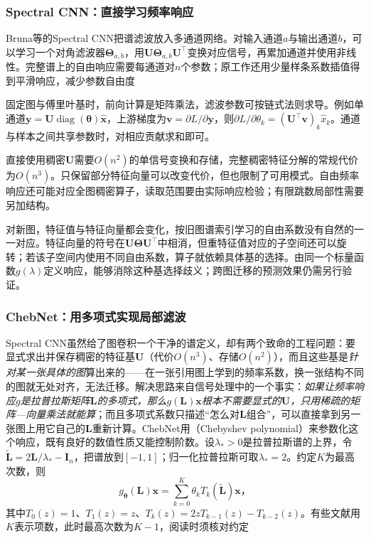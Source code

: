 \subsubsection{Spectral CNN：直接学习频率响应}
\label{sec:gnn-spectral-cnn}

Bruna等的Spectral CNN把谱滤波放入多通道网络。对输入通道$a$与输出通道$b$，可以学习一个对角滤波器$\bm{\Theta}_{a,b}$，用$\bm{U}\bm{\Theta}_{a,b}\bm{U}^{\top}$变换对应信号，再累加通道并使用非线性。完整谱上的自由响应需要每通道对$n$个参数；原工作还用少量样条系数插值得到平滑响应，减少参数自由度

固定图与傅里叶基时，前向计算是矩阵乘法，滤波参数可按链式法则求导。例如单通道$\bm{y}=\bm{U}\operatorname{diag}(\bm{\theta})\widehat{\bm{x}}$，上游梯度为$\bm{v}=\partial L/\partial\bm{y}$，则$\partial L/\partial\theta_k=(\bm{U}^{\top}\bm{v})_k\widehat x_k$。通道与样本之间共享参数时，对相应贡献求和即可。

直接使用稠密$\bm{U}$需要$O(n^2)$的单信号变换和存储，完整稠密特征分解的常规代价为$O(n^3)$。只保留部分特征向量可以改变代价，但也限制了可用模式。自由频率响应还可能对应全图稠密算子，读取范围要由实际响应检验；有限跳数局部性需要另加结构。

对新图，特征值与特征向量都会变化，按旧图谱索引学习的自由系数没有自然的一一对应。特征向量的符号在$\bm{U}\bm{\Theta}\bm{U}^{\top}$中相消，但重特征值对应的子空间还可以旋转；若该子空间内使用不同自由系数，算子就依赖具体基的选择。由同一个标量函数$g(\lambda)$定义响应，能够消除这种基选择歧义；跨图迁移的预测效果仍需另行验证。

\subsubsection{ChebNet：用多项式实现局部滤波}
\label{sec:gnn-chebnet}

Spectral CNN虽然给了图卷积一个干净的谱定义，却有两个致命的工程问题：要显式求出并保存稠密的特征基$\bm U$（代价$O(n^3)$、存储$O(n^2)$），而且这些基是\emph{针对某一张具体的图}算出来的——在一张引用图上学到的频率系数，换一张结构不同的图就无处对齐，无法迁移。解决思路来自信号处理中的一个事实：\emph{如果让频率响应$g$是拉普拉斯矩阵$\bm L$的多项式，那么$g(\bm L)\bm x$根本不需要显式的$\bm U$，只用稀疏的矩阵—向量乘法就能算}；而且多项式系数只描述“怎么对$\bm L$组合”，可以直接拿到另一张图上用它自己的$\bm L$重新计算。ChebNet用（Chebyshev polynomial）来参数化这个响应，既有良好的数值性质又能控制阶数。设$\lambda_*>0$是拉普拉斯谱的上界，令$\widetilde{\bm{L}}=2\bm{L}/\lambda_*-\bm{I}_n$，把谱放到$[-1,1]$；归一化拉普拉斯可取$\lambda_*=2$。约定$K$为最高次数，则
\begin{equation}
  g_{\bm{\theta}}(\bm{L})\bm{x}
    =\sum_{k=0}^{K}\theta_k T_k(\widetilde{\bm{L}})\bm{x}\text{，}
  \label{eq:gnn-chebyshev-filter}
\end{equation}
其中$T_0(z)=1$、$T_1(z)=z$、$T_k(z)=2zT_{k-1}(z)-T_{k-2}(z)$。有些文献用$K$表示项数，此时最高次数为$K-1$，阅读时须核对约定

